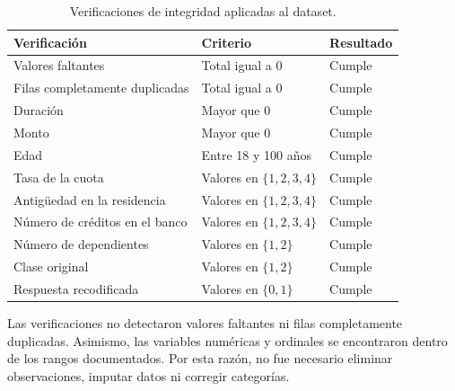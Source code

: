 \begin{table}[H]
    \centering
    \caption{Verificaciones de integridad aplicadas al dataset.}
    \label{tab:verificaciones-integridad}

    \begin{tabularx}{0.94\textwidth}{
        @{}
        X
        >{\centering\arraybackslash}p{2.1cm}
        >{\centering\arraybackslash}p{1.8cm}
        @{}
    }
        \toprule
        Verificación & Criterio & Resultado \\
        \midrule

        Valores faltantes
        & Total igual a \(0\)
        & Cumple \\

        Filas completamente duplicadas
        & Total igual a \(0\)
        & Cumple \\

        Duración
        & Mayor que \(0\)
        & Cumple \\

        Monto
        & Mayor que \(0\)
        & Cumple \\

        Edad
        & Entre 18 y 100 años
        & Cumple \\

        Tasa de la cuota
        & Valores en \(\{1,2,3,4\}\)
        & Cumple \\

        Antigüedad en la residencia
        & Valores en \(\{1,2,3,4\}\)
        & Cumple \\

        Número de créditos en el banco
        & Valores en \(\{1,2,3,4\}\)
        & Cumple \\

        Número de dependientes
        & Valores en \(\{1,2\}\)
        & Cumple \\

        Clase original
        & Valores en \(\{1,2\}\)
        & Cumple \\

        Respuesta recodificada
        & Valores en \(\{0,1\}\)
        & Cumple \\

        \bottomrule
    \end{tabularx}
\end{table}

Las verificaciones no detectaron valores faltantes ni filas completamente
duplicadas. Asimismo, las variables numéricas y ordinales se encontraron
dentro de los rangos documentados. Por esta razón, no fue necesario
eliminar observaciones, imputar datos ni corregir categorías.

